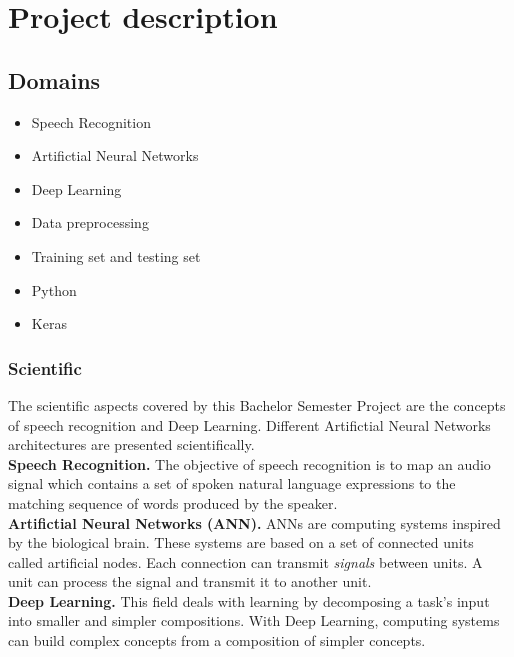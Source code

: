 \section{Project description}
\subsection{Domains}

\begin{itemize}
        \item Speech Recognition
        \item Artifictial Neural Networks
        \item Deep Learning 
        \item Data preprocessing
        \item Training set and testing set
        \item Python
        \item Keras
\end{itemize}

\subsubsection{Scientific}

The scientific aspects covered by this Bachelor Semester Project are the
concepts of speech recognition and Deep Learning. Different Artifictial Neural
Networks architectures are presented scientifically. \\

\textbf{Speech Recognition.} The objective of speech recognition is to map an
audio signal which contains a set of spoken natural language expressions to the
matching sequence of words produced by the speaker.\\


\textbf{Artifictial Neural Networks (ANN).} ANNs are computing systems inspired
by the biological brain. These systems are based on a set of connected units
called artificial nodes. Each connection can transmit \textit{signals} between
units. A unit can process the signal and transmit it to another unit.\\

\textbf{Deep Learning.} This field deals with learning by decomposing a task's
input into smaller and simpler compositions. With Deep Learning, computing
systems can build complex concepts from a composition of simpler concepts.

